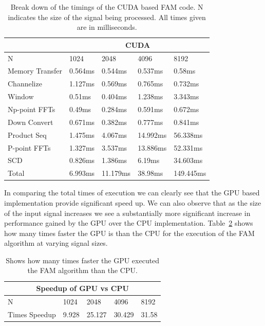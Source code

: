 \begin{table}
\begin{center}
\begin{tabular}{|l|l|l|l|l|}
\hline
 & \multicolumn{4}{|c|}{CUDA} \\
\hline
N & 1024 & 2048 & 4096 & 8192 \\
\hline
Memory Transfer & 0.564ms & 0.544ms & 0.537ms & 0.58ms \\
Channelize & 1.127ms & 0.569ms & 0.765ms & 0.732ms \\
Window & 0.51ms & 0.404ms & 1.238ms & 3.343ms \\
Np-point FFTs & 0.49ms & 0.284ms & 0.591ms & 0.672ms \\
Down Convert & 0.671ms & 0.382ms & 0.777ms & 0.841ms \\
Product Seq & 1.475ms & 4.067ms & 14.992ms & 56.338ms \\
P-point FFTs & 1.327ms & 3.537ms & 13.886ms & 52.331ms \\
SCD & 0.826ms & 1.386ms & 6.19ms & 34.603ms \\
\hline
Total & 6.993ms & 11.179ms & 38.98ms & 149.445ms \\
\hline
\end{tabular}
\vspace{0.5cm}
\caption{Break down of the timings of the CUDA based FAM code.  N indicates the size of the signal being processed.  All times given are in milliseconds.}
\label{tbl:fam_cuda_timings}
\end{center}
\end{table}

In comparing the total times of execution we can clearly see that the GPU based implementation provide significant speed up.  We can also observe that as the size of the input signal increases we see a substantially more significant increase in performance gained by the GPU over the CPU implementation.  Table~\ref{tbl:fam_gpu_speedup} shows how many times faster the GPU is than the CPU for the execution of the FAM algorithm at varying signal sizes.

\begin{table}
\begin{center}
\begin{tabular}{|l|l|l|l|l|}
\hline
\multicolumn{5}{|c|}{Speedup of GPU vs CPU} \\
\hline
N & 1024 & 2048 & 4096 & 8192 \\
\hline
Times Speedup & 9.928 & 25.127 & 30.429 & 31.58 \\
\hline
\end{tabular}
\vspace{0.5cm}
\caption{Shows how many times faster the GPU executed the FAM algorithm than the CPU.}
\label{tbl:fam_gpu_speedup}
\end{center}
\end{table}

